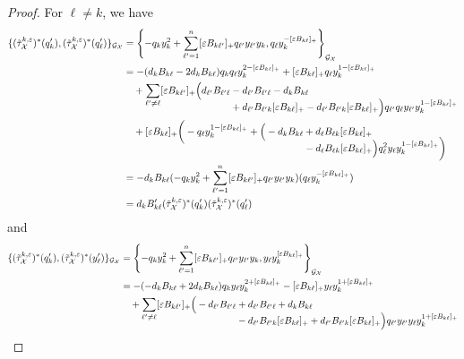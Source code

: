 \documentclass{amsart}
\numberwithin{equation}{section}
\newcommand{\cG}{\mathcal{G}}
\newcommand{\cX}{\mathcal{X}}
\begin{document}
\begin{proof}
  For $\ell\ne k$, we have
  \begin{align*}
    \{(\tilde\tau_\cX^{k,\varepsilon})^*(q'_k),(\tilde\tau_\cX^{k,\varepsilon})^*(q'_\ell)\}_{\cG_\cX}
    &=\left\{-q_k y_k^2 + \sum\limits_{\ell'=1}^n[\varepsilon B_{k\ell'}]_+ q_{\ell'} y_{\ell'} y_k,q_\ell y_k^{-[\varepsilon B_{k\ell}]_+}\right\}_{\cG_\cX}\\
    &=-(d_k B_{k\ell}-2 d_k B_{k\ell}) q_k q_\ell y_k^{2-[\varepsilon B_{k\ell}]_+} + [\varepsilon B_{k\ell}]_+ q_\ell y_k^{1-[\varepsilon B_{k\ell}]_+}\\
    &\quad + \sum\limits_{\ell'\ne\ell} [\varepsilon B_{k\ell'}]_+\Big(d_{\ell'} B_{\ell' \ell} - d_{\ell'} B_{\ell' \ell} -d_k B_{k\ell}\\[-13pt]
    &\hspace{1.5in}+ d_{\ell'} B_{\ell' k} [\varepsilon B_{k\ell}]_+ - d_{\ell'} B_{\ell' k} [\varepsilon B_{k\ell}]_+ \Big) q_{\ell'} q_\ell y_{\ell'} y_k^{1-[\varepsilon B_{k\ell}]_+}\\
    &\quad + [\varepsilon B_{k\ell}]_+ \bigg(-q_\ell y_k^{1-[\varepsilon B_{k\ell}]_+} + \Big( -d_k B_{k\ell} + d_\ell B_{\ell k} [\varepsilon B_{k\ell}]_+\\[-11pt]
    &\hspace{2.53in}- d_\ell B_{\ell k} [\varepsilon B_{k\ell}]_+\Big) q_\ell^2 y_\ell y_k^{1-[\varepsilon B_{k\ell}]_+}\bigg)\\
    &=-d_k B_{k\ell} (-q_k y_k^2 + \sum\limits_{\ell'=1}^n[\varepsilon B_{k\ell'}]_+ q_{\ell'} y_{\ell'} y_k)(q_\ell y_k^{-[\varepsilon B_{k\ell}]_+})\\
    &=d_k B'_{k\ell}(\tilde\tau_\cX^{k,\varepsilon})^*(q'_k) (\tilde\tau_\cX^{k,\varepsilon})^*(q'_\ell)
  \end{align*}
  and
  \begin{align*}
    \{(\tilde\tau_\cX^{k,\varepsilon})^*(q'_k),(\tilde\tau_\cX^{k,\varepsilon})^*(y'_\ell)\}_{\cG_\cX}
    &=\left\{-q_k y_k^2 + \sum\limits_{\ell'=1}^n[\varepsilon B_{k\ell'}]_+ q_{\ell'} y_{\ell'} y_k,y_\ell y_k^{[\varepsilon B_{k\ell}]_+}\right\}_{\cG_\cX}\\
    &=-(-d_k B_{k\ell} + 2 d_k B_{k\ell}) q_k y_\ell y_k^{2+[\varepsilon B_{k\ell}]_+} - [\varepsilon B_{k\ell}]_+ y_\ell y_k^{1+[\varepsilon B_{k\ell}]_+}\\
    &\quad + \sum\limits_{\ell'\ne\ell} [\varepsilon B_{k\ell'}]_+ \Big(-d_{\ell'} B_{\ell' \ell} + d_{\ell'} B_{\ell' \ell} + d_k B_{k\ell}\\[-13pt]
    &\hspace{1.67in}- d_{\ell'} B_{\ell' k} [\varepsilon B_{k\ell}]_+ + d_{\ell'} B_{\ell' k} [\varepsilon B_{k\ell}]_+ \Big) q_{\ell'} y_{\ell'} y_\ell y_k^{1+[\varepsilon B_{k\ell}]_+}\\

\end{align*}
\end{proof}
\end{document}
